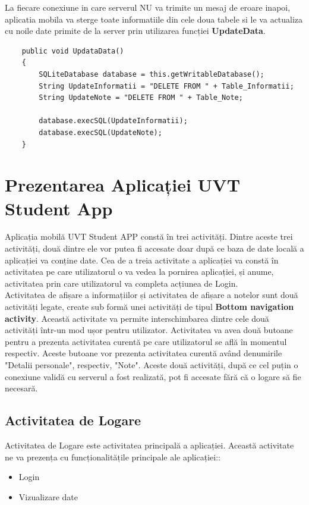 \documentclass{article}
\begin{document}
	La fiecare conexiune in care serverul NU va trimite un mesaj de eroare inapoi, aplicatia mobila va sterge toate informatiile din cele doua tabele si le va actualiza cu noile date primite de la server prin utilizarea funcției \textbf{UpdateData}.

	\begin{verbatim}
    public void UpdataData()
    {
        SQLiteDatabase database = this.getWritableDatabase();
        String UpdateInformatii = "DELETE FROM " + Table_Informatii;
        String UpdateNote = "DELETE FROM " + Table_Note;

        database.execSQL(UpdateInformatii);
        database.execSQL(UpdateNote);
    }
	\end{verbatim}
	
	\newpage

	\section{Prezentarea Aplicației UVT Student App}

		Aplicația mobilă UVT Student APP constă în trei activități. Dintre aceste trei activități, două dintre ele vor putea fi accesate doar după ce baza de date locală a aplicației va conține date. Cea de a treia activitate a aplicației va constă în activitatea pe care utilizatorul o va vedea la pornirea aplicației, și anume, activitatea prin care utilizatorul va completa acțiunea de Login. \\

		Activitatea de afișare a informațiilor și activitatea de afișare a notelor sunt două activități legate, create sub formă unei activități de tipul \textbf{Bottom navigation activity}. Această activitate va permite interschimbarea dintre cele două activități într-un mod ușor pentru utilizator. Activitatea va avea două butoane pentru a prezenta activitatea curentă pe care utilizatorul se află în momentul respectiv. Aceste butoane vor prezenta activitatea curentă având denumirile "Detalii personale", respectiv, "Note". Aceste două activități, după ce cel puțin o conexiune validă cu serverul a fost realizată, pot fi accesate fără că o logare să fie necesară.

		\subsection{Activitatea de Logare}

		Activitatea de Logare este activitatea principală a aplicației. Această activitate ne va prezența cu funcționalitățile principale ale aplicației::
		\begin{itemize}
			\item Login
			\item Vizualizare date
		\end{itemize}
\end{document}
